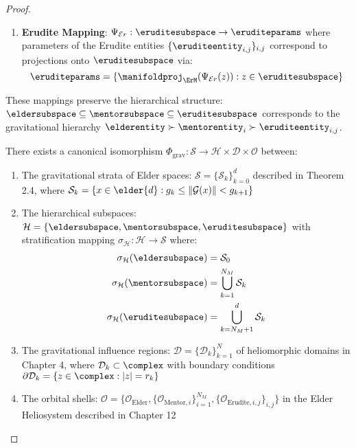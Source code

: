 \begin{proof}
\begin{theorem}
\begin{enumerate}
    \item \textbf{Erudite Mapping}: $\Psi_{\mathcal{E}r}: \eruditesubspace \rightarrow \eruditeparams$ where parameters of the Erudite entities $\{\eruditeentity_{i,j}\}_{i,j}$ correspond to projections onto $\eruditesubspace$ via:
    \begin{equation}
        \eruditeparams = \{\manifoldproj_{\ErM}(\Psi_{\mathcal{E}r}(z)) : z \in \eruditesubspace\}
    \end{equation}
\end{enumerate}

These mappings preserve the hierarchical structure: $\eldersubspace \subseteq \mentorsubspace \subseteq \eruditesubspace$ corresponds to the gravitational hierarchy $\elderentity \succ \mentorentity_i \succ \eruditeentity_{i,j}$.
\end{theorem}

\begin{theorem}
\label{thm:gravitational_stratification}
There exists a canonical isomorphism $\Phi_{\text{grav}}: \mathcal{S} \rightarrow \mathcal{H} \times \mathcal{D} \times \mathcal{O}$ between:
\begin{enumerate}
    \item The gravitational strata of Elder spaces: $\mathcal{S} = \{\mathcal{S}_k\}_{k=0}^{d}$ described in Theorem 2.4, where $\mathcal{S}_k = \{x \in \elder{d} : g_k \leq \|\mathcal{G}(x)\| < g_{k+1}\}$
    
    \item The hierarchical subspaces: $\mathcal{H} = \{\eldersubspace, \mentorsubspace, \eruditesubspace\}$ with stratification mapping $\sigma_{\mathcal{H}}: \mathcal{H} \rightarrow \mathcal{S}$ where:
    \begin{align}
        \sigma_{\mathcal{H}}(\eldersubspace) &= \mathcal{S}_0 \\
        \sigma_{\mathcal{H}}(\mentorsubspace) &= \bigcup_{k=1}^{N_M} \mathcal{S}_k \\
        \sigma_{\mathcal{H}}(\eruditesubspace) &= \bigcup_{k=N_M+1}^{d} \mathcal{S}_k
    \end{align}
    
    \item The gravitational influence regions: $\mathcal{D} = \{\mathcal{D}_k\}_{k=1}^N$ of heliomorphic domains in Chapter 4, where $\mathcal{D}_k \subset \complex$ with boundary conditions $\partial\mathcal{D}_k = \{z \in \complex : |z| = r_k\}$
    
    \item The orbital shells: $\mathcal{O} = \{\mathcal{O}_{\text{Elder}}, \{\mathcal{O}_{\text{Mentor},i}\}_{i=1}^{N_M}, \{\mathcal{O}_{\text{Erudite},i,j}\}_{i,j}\}$ in the Elder Heliosystem described in Chapter 12
\end{enumerate}


\end{theorem}
\end{proof}
